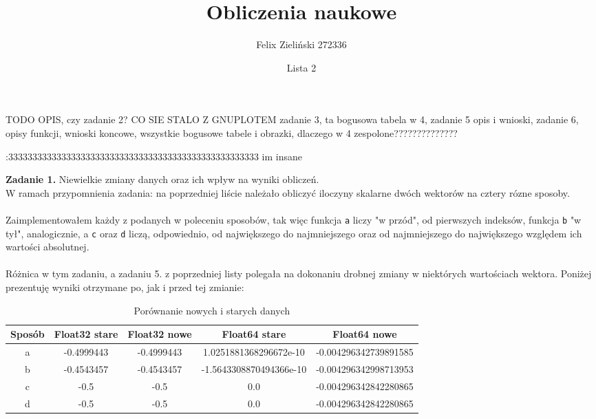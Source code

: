 \documentclass[15pt, a4paper]{article}
\title{Obliczenia naukowe}
\author{Felix Zieliński 272336}
\date{Lista 2}
\begin{document}
\maketitle
TODO OPIS, czy zadanie 2? CO SIE STALO Z GNUPLOTEM zadanie 3, ta bogusowa tabela w 4, zadanie 5 opis i wnioski, zadanie 6, opisy funkcji, wnioski koncowe, wszystkie bogusowe tabele i obrazki, dlaczego w 4 zespolone??????????????

:3333333333333333333333333333333333333333333333333333 im insane

\vspace{0.5cm}

\noindent\hrulefill


\vspace{0.5cm}

\noindent\textbf{Zadanie 1.} Niewielkie zmiany danych oraz ich wpływ na wyniki obliczeń.\\

\noindent W ramach przypomnienia zadania: na poprzedniej liście  należało obliczyć iloczyny skalarne dwóch wektorów na cztery rózne sposoby.\\\\
Zaimplementowałem każdy z podanych w poleceniu sposobów, tak więc funkcja \verb|a| liczy "w przód", od pierwszych indeksów, funkcja \verb|b| "w tył", analogicznie, a \verb|c| oraz \verb|d| liczą, odpowiednio, od największego do najmniejszego oraz od najmniejszego do największego względem ich wartości absolutnej.\\\\
Różnica w tym zadaniu, a zadaniu 5. z poprzedniej listy polegała na dokonaniu drobnej zmiany w niektórych wartościach wektora. Poniżej prezentuję wyniki otrzymane po, jak i przed tej zmianie:


\begin{table}[ht]
    \begin{adjustbox}{max width=\textwidth}
    \begin{tabular}{|c|c|c|c|c|}
        \hline 
        Sposób & Float32 stare & Float32 nowe & Float64 stare & Float64 nowe \\ \hline
        a & -0.4999443 & -0.4999443 & 1.0251881368296672e-10 & -0.004296342739891585 \\ \hline
        b & -0.4543457 & -0.4543457 & -1.5643308870494366e-10 & -0.004296342998713953 \\ \hline
        c & -0.5 & -0.5 & 0.0 & -0.004296342842280865 \\ \hline
        d & -0.5 & -0.5 & 0.0 & -0.004296342842280865 \\ \hline
    \end{tabular}
    \end{adjustbox}
    \caption{Porównanie nowych i starych danych}
    \label{tab:products}
\end{table}
\end{document}
